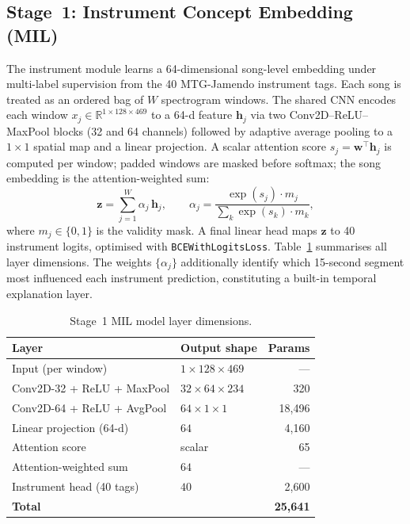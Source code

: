 \documentclass[sigconf,nonacm]{acmart}
\begin{document}
\subsection{Stage~1: Instrument Concept Embedding (MIL)}

The instrument module learns a 64-dimensional song-level embedding under multi-label supervision
from the 40 MTG-Jamendo instrument tags. Each song is treated as an ordered bag of $W$
spectrogram windows. The shared CNN encodes each window $x_j\in\mathbb{R}^{1\times128\times469}$
to a 64-d feature $\mathbf{h}_j$ via two Conv2D--ReLU--MaxPool blocks (32 and 64 channels)
followed by adaptive average pooling to a $1\!\times\!1$ spatial map and a linear projection.
A scalar attention score $s_j=\mathbf{w}^{\!\top}\mathbf{h}_j$ is computed per window; padded
windows are masked before softmax; the song embedding is the attention-weighted sum:
\begin{equation}
  \mathbf{z} = \sum_{j=1}^{W} \alpha_j\,\mathbf{h}_j,\qquad
  \alpha_j = \frac{\exp(s_j)\cdot m_j}{\sum_{k}\exp(s_k)\cdot m_k},
\end{equation}
where $m_j\in\{0,1\}$ is the validity mask. A final linear head maps $\mathbf{z}$ to 40
instrument logits, optimised with \texttt{BCEWithLogitsLoss}. Table~\ref{tab:arch} summarises
all layer dimensions. The weights $\{\alpha_j\}$ additionally identify which 15-second segment
most influenced each instrument prediction, constituting a built-in temporal explanation layer.

\begin{table}[h]
  \caption{Stage~1 MIL model layer dimensions.}
  \label{tab:arch}
  \begin{tabular}{llr}
    \toprule
    Layer & Output shape & Params \\
    \midrule
    Input (per window)           & $1\!\times\!128\!\times\!469$ & --- \\
    Conv2D-32 + ReLU + MaxPool   & $32\!\times\!64\!\times\!234$ & 320 \\
    Conv2D-64 + ReLU + AvgPool   & $64\!\times\!1\!\times\!1$    & 18,496 \\
    Linear projection (64-d)     & $64$                          & 4,160 \\
    Attention score              & scalar                        & 65 \\
    Attention-weighted sum       & $64$                          & --- \\
    Instrument head (40 tags)    & $40$                          & 2,600 \\
    \midrule
    \textbf{Total}               &                               & \textbf{25,641} \\
    \bottomrule
  \end{tabular}
\end{table}
\end{document}
